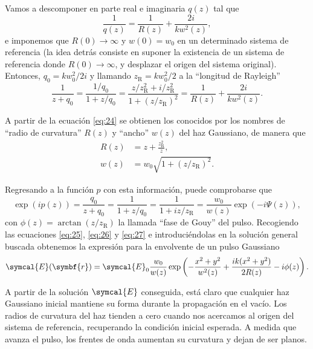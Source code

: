 \documentclass{scrartcl} %
\begin{document}
Vamos a descomponer en parte real e imaginaria $q(z)$ tal que
\begin{equation}\label{eq:23}
  \frac{1}{q(z)} = \frac{1}{R(z)} + \frac{2i}{kw^{2}(z)},
\end{equation}
e imponemos que $R(0) \rightarrow \infty$ y $w(0) = w_{0}$ en un determinado sistema de referencia (la idea detrás consiste en suponer la existencia de un sistema de referencia donde $R(0) \rightarrow \infty$, y desplazar el origen del sistema original). Entonces, $q_{0} = kw^{2}_{0}/2i$ y llamando $z_{\mathrm{R}} = kw^{2}_{0}/2$ a la \enquote{longitud de Rayleigh}
\begin{equation}\label{eq:24}
  \frac{1}{z + q_{0}} = \frac{1/q_{0}}{1 + z/q_{0}} = \frac{z/z^{2}_{\mathrm{R}} + i/z^{2}_{\mathrm{R}}}{1 + (z/z_{\mathrm{R}})^{2}} = \frac{1}{R(z)} + \frac{2i}{kw^{2}(z)}.
\end{equation}

A partir de la ecuación \eqref{eq:24} se obtienen los conocidos por los nombres de \enquote{radio de curvatura} $R(z)$ y \enquote{ancho} $w(z)$ del haz Gaussiano, de manera que 
\begin{align}
  R(z) & = z + \frac{z^{2}_{\mathrm{R}}}{z}, \label{eq:25} \\
  w(z) & = w_{0}\sqrt{1 + (z/z_{\mathrm{R}})^{2}} \label{eq:26}.
\end{align}

Regresando a la función $p$ con esta información, puede comprobarse que
\begin{equation}\label{eq:27}
  \exp(ip(z)) = \frac{q_{0}}{z+q_{0}} = \frac{1}{1 + z/q_{0}} = \frac{1}{1 + iz/z_{\mathrm{R}}} = \frac{w_{0}}{w(z)}\exp(-i \Psi(z)),
\end{equation}
con $\phi(z) = \arctan(z/z_{\mathrm{R}})$ la llamada \enquote{fase de Gouy} del pulso. Recogiendo las ecuaciones \eqref{eq:25}, \eqref{eq:26} y \eqref{eq:27} e introduciéndolas en la solución general buscada obtenemos la expresión para la envolvente de un pulso Gaussiano 
\begin{equation}\label{eq:28}
  \symcal{E}(\symbf{r}) = \symcal{E}_{0}\frac{w_{0}}{w(z)}\exp\left(-\frac{x^{2}+y^{2}}{w^{2}(z)} + \frac{ik(x^{2}+y^{2})}{2R(z)} - i \phi(z)\right).
\end{equation}
 
A partir de la solución $\symcal{E}$ conseguida, está claro que cualquier haz Gaussiano inicial mantiene su forma durante la propagación en el vacío. Los radios de curvatura del haz tienden a cero cuando nos acercamos al origen del sistema de referencia, recuperando la condición inicial esperada. A medida que avanza el pulso, los frentes de onda aumentan su curvatura y dejan de ser planos.
\end{document}

